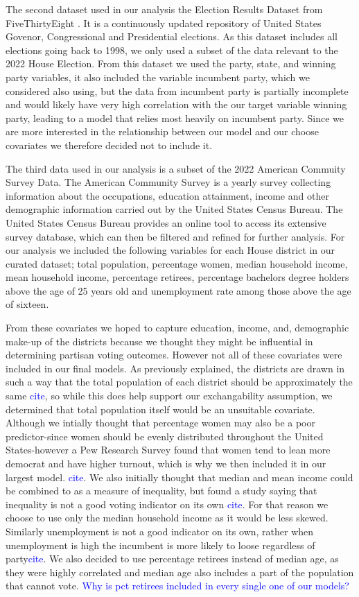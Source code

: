 \documentclass[12pt]{article}
\newcommand{\blue}[1]{\textcolor{blue}{#1}}
\begin{document}
The second dataset used in our analysis the Election Results Dataset from FiveThirtyEight \cite{electionresultsdataset}. It is a continuously updated repository of United States Govenor, Congressional and Presidential elections. As this dataset includes all elections going back to 1998, we only used a subset of the data relevant to the 2022 House Election. From this dataset we used the party, state, and winning party variables, it also included the variable incumbent party, which we considered also using, but the data from incumbent party is partially incomplete and would likely have very high correlation with the our target variable winning party, leading to a model that relies most heavily on incumbent party. Since we are more interested in the relationship between our model and our choose covariates we therefore decided not to include it.  

The third data used in our analysis is a subset of the 2022 American Commuity Survey Data. The American Community Survey is a yearly survey collecting information about the occupations, education attainment, income and other demographic information carried out by the United States Census Bureau. The United States Census Bureau provides an online tool to access its extensive survey database, which can then be filtered and refined for further analysis. For our analysis we included the following variables for each House district in our curated dataset; total population, percentage women, median household income, mean household income, percentage retirees, percentage bachelors degree holders above the age of 25 years old and unemployment rate among those above the age of sixteen. 

From these covariates we hoped to capture education, income, and, demographic make-up  of the districts because we thought they might be influential in determining partisan voting outcomes. However not all of these covariates were included in our final models. As previously explained, the districts are drawn in such a way that the total population of each district should be approximately the same \blue{cite}, so while this does help support our exchangability assumption, we determined that total population itself would be an unsuitable covariate. Although we intially thought that percentage women may also be a poor predictor-since women should be evenly distributed throughout the United States-however a Pew Research Survey found that women tend to lean more democrat and have higher turnout, which is why we then included it in our largest model. \blue{cite}. We also initially thought that median and mean income could be combined to as a measure of inequality, but found a study saying that inequality is not a good voting indicator on its own \blue{cite}. For that reason we choose to use only the median household income as it would be less skewed. Similarly unemployment is not a good indicator on its own, rather when unemployment is high the incumbent is more likely to loose regardless of party\blue{cite}.  We also decided to use percentage retirees instead of median age, as they were highly correlated and median age also includes a part of the population that cannot vote. 
\blue{ Why is pct retirees included in every single one of our models? }
\end{document}
